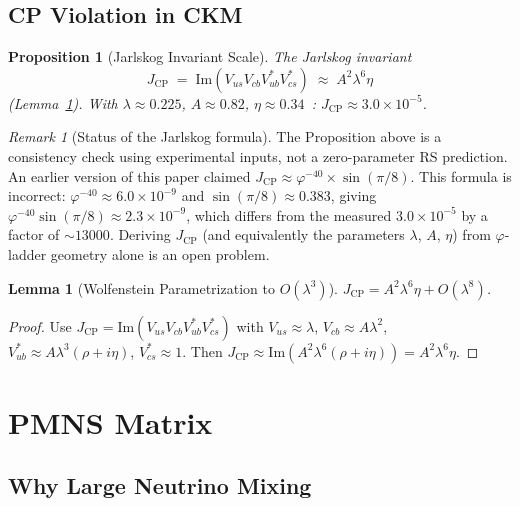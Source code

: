 \documentclass[12pt,a4paper]{article}
\newtheorem{lemma}[theorem]{Lemma}
\newtheorem{proposition}[theorem]{Proposition}
\theoremstyle{definition}
\theoremstyle{remark}
\newtheorem{remark}[theorem]{Remark}
\begin{document}
\subsection{CP Violation in CKM}

\begin{proposition}[Jarlskog Invariant Scale]
\label{prop:jarlskog}
The Jarlskog invariant
\[
  J_{\mathrm{CP}} \;=\;
  \mathrm{Im}(V_{us}V_{cb}V_{ub}^*V_{cs}^*)
  \;\approx\; A^2\lambda^6\eta
\]
(Lemma~\ref{lem:wolf}).
With $\lambda \approx 0.225$, $A \approx 0.82$,
$\eta \approx 0.34$~\cite{PDG2024}:
$J_{\mathrm{CP}} \approx 3.0 \times 10^{-5}$.
\end{proposition}

\begin{remark}[Status of the Jarlskog formula]
The Proposition above is a consistency check using experimental inputs,
not a zero-parameter RS prediction.  An earlier version of this paper
claimed $J_{\mathrm{CP}} \approx \varphi^{-40} \times \sin(\pi/8)$.
This formula is incorrect: $\varphi^{-40} \approx 6.0\times10^{-9}$
and $\sin(\pi/8) \approx 0.383$, giving
$\varphi^{-40}\sin(\pi/8) \approx 2.3\times10^{-9}$, which differs
from the measured $3.0\times10^{-5}$ by a factor of $\sim13000$.
Deriving $J_{\mathrm{CP}}$ (and equivalently the parameters $\lambda$,
$A$, $\eta$) from $\varphi$-ladder geometry alone is an open problem.
\end{remark}

\begin{lemma}[Wolfenstein Parametrization to $O(\lambda^3)$]
\label{lem:wolf}
$J_{\mathrm{CP}} = A^2\lambda^6\eta + O(\lambda^8)$.
\end{lemma}

\begin{proof}
Use $J_{\mathrm{CP}} = \mathrm{Im}(V_{us}V_{cb}V_{ub}^*V_{cs}^*)$
with $V_{us}\approx\lambda$, $V_{cb}\approx A\lambda^2$,
$V_{ub}^*\approx A\lambda^3(\rho+i\eta)$, $V_{cs}^*\approx1$.
Then $J_{\mathrm{CP}} \approx \mathrm{Im}(A^2\lambda^6(\rho+i\eta))
= A^2\lambda^6\eta$.
\end{proof}

\section{PMNS Matrix}
\label{sec:pmns}

\subsection{Why Large Neutrino Mixing}
\end{document}
